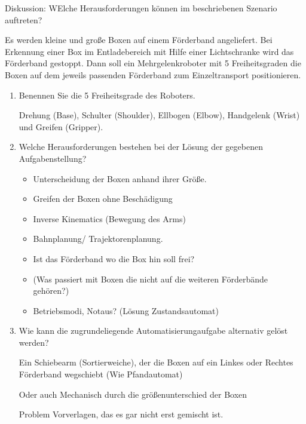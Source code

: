 \documentclass[a4paper]{article}
\begin{document}
Diskussion: WElche Herausforderungen können im beschriebenen Szenario auftreten?

Es werden kleine und große Boxen auf einem Förderband angeliefert. Bei Erkennung einer Box im Entladebereich mit Hilfe einer Lichtschranke wird das Förderband gestoppt. Dann soll ein Mehrgelenkroboter mit 5 Freiheitsgraden die Boxen auf dem jeweils passenden Förderband zum Einzeltransport positionieren.

\begin{enumerate}
    \item Benennen Sie die 5 Freiheitsgrade des Roboters.
    
    Drehung (Base), Schulter (Shoulder), Ellbogen (Elbow), Handgelenk (Wrist) und Greifen (Gripper).
    \item Welche Herausforderungen bestehen bei der Lösung der gegebenen Aufgabenstellung?
    
    \begin{itemize}
        \item Unterscheidung der Boxen anhand ihrer Größe.
        \item Greifen der Boxen ohne Beschädigung
        \item Inverse Kinematics (Bewegung des Arms)
        \item Bahnplanung/ Trajektorenplanung.
        \item Ist das Förderband wo die Box hin soll frei?
        \item (Was passiert mit Boxen die nicht auf die weiteren Förderbände gehören?)
        \item Betriebsmodi, Notaus? (Lösung Zustandsautomat)
    \end{itemize}
    \item Wie kann die zugrundeliegende Automatisierungaufgabe alternativ gelöst werden?
    
    Ein Schiebearm (Sortierweiche), der die Boxen auf ein Linkes oder Rechtes Förderband wegschiebt (Wie Pfandautomat)

    Oder auch Mechanisch durch die größenunterschied der Boxen

    Problem Vorverlagen, das es gar nicht erst gemischt ist.
\end{enumerate}
\end{document}
